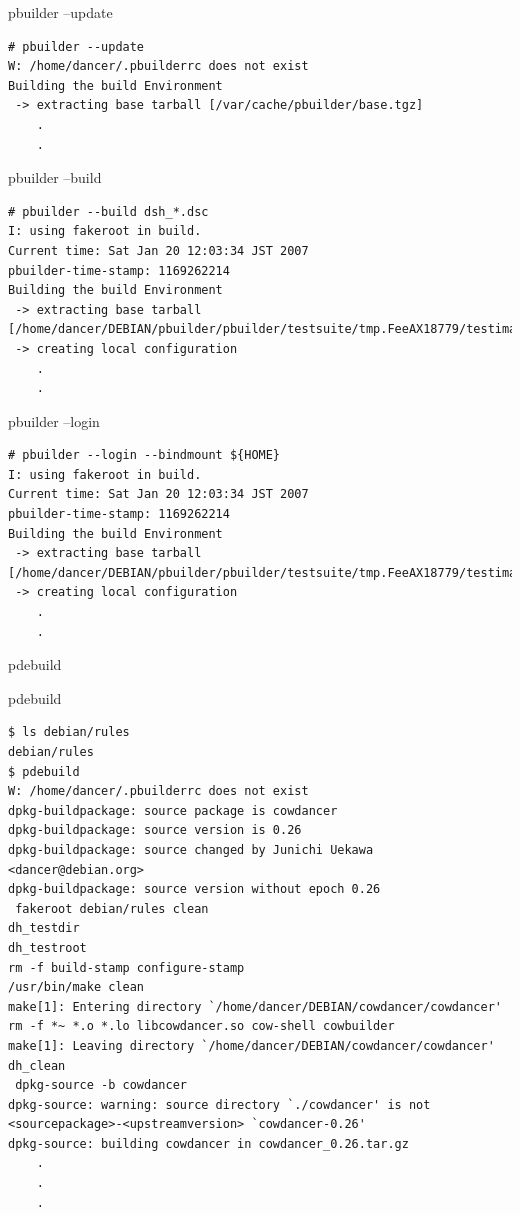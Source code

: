 \documentclass[dvipdfm,17pt,times]{beamer}
\newcommand{\emtext}[1]{
\begin{frame}{}
 
{\Huge #1
}
\end{frame}
}
\begin{document}
\begin{frame}[containsverbatim]{pbuilder --update}
\begin{verbatim}
# pbuilder --update
W: /home/dancer/.pbuilderrc does not exist
Building the build Environment
 -> extracting base tarball [/var/cache/pbuilder/base.tgz]
	.
	.
\end{verbatim}
\end{frame}

\begin{frame}[containsverbatim]{pbuilder --build}
\begin{verbatim}
# pbuilder --build dsh_*.dsc
I: using fakeroot in build.
Current time: Sat Jan 20 12:03:34 JST 2007
pbuilder-time-stamp: 1169262214
Building the build Environment
 -> extracting base tarball [/home/dancer/DEBIAN/pbuilder/pbuilder/testsuite/tmp.FeeAX18779/testimage]
 -> creating local configuration
	.
	.
\end{verbatim}
\end{frame}


\begin{frame}[containsverbatim]{pbuilder --login}
\begin{verbatim}
# pbuilder --login --bindmount ${HOME}
I: using fakeroot in build.
Current time: Sat Jan 20 12:03:34 JST 2007
pbuilder-time-stamp: 1169262214
Building the build Environment
 -> extracting base tarball [/home/dancer/DEBIAN/pbuilder/pbuilder/testsuite/tmp.FeeAX18779/testimage]
 -> creating local configuration
	.
	.
\end{verbatim}
\end{frame}

\emtext{pdebuild}

\begin{frame}[containsverbatim]{pdebuild}
\begin{verbatim}
$ ls debian/rules
debian/rules
$ pdebuild
W: /home/dancer/.pbuilderrc does not exist
dpkg-buildpackage: source package is cowdancer
dpkg-buildpackage: source version is 0.26
dpkg-buildpackage: source changed by Junichi Uekawa <dancer@debian.org>
dpkg-buildpackage: source version without epoch 0.26
 fakeroot debian/rules clean
dh_testdir
dh_testroot
rm -f build-stamp configure-stamp
/usr/bin/make clean
make[1]: Entering directory `/home/dancer/DEBIAN/cowdancer/cowdancer'
rm -f *~ *.o *.lo libcowdancer.so cow-shell cowbuilder
make[1]: Leaving directory `/home/dancer/DEBIAN/cowdancer/cowdancer'
dh_clean
 dpkg-source -b cowdancer
dpkg-source: warning: source directory `./cowdancer' is not <sourcepackage>-<upstreamversion> `cowdancer-0.26'
dpkg-source: building cowdancer in cowdancer_0.26.tar.gz
	.
	.
	.
\end{verbatim}
\end{frame}
\end{document}
